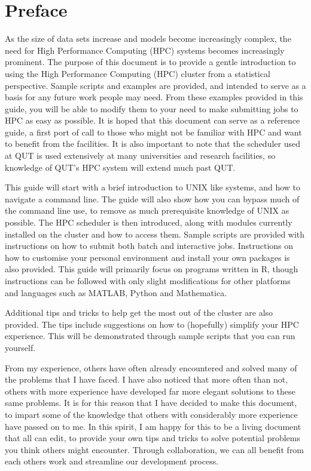 \section*{Preface}
As the size of data sets increase and models become increasingly complex, the need for High Performance Computing (HPC) systems becomes increasingly prominent. The purpose of this document is to provide a gentle introduction to using the High Performance Computing (HPC) cluster from a statistical perspective. Sample scripts and examples are provided, and intended to serve as a basis for any future work people may need. From these examples provided in this guide, you will be able to modify them to your need to make submitting jobs to HPC as easy as possible. It is hoped that this document can serve as a reference guide, a first port of call to those who might not be familiar with HPC and want to benefit from the facilities. It is also important to note that the scheduler used at QUT is used extensively at many universities and research facilities, so knowledge of QUT's HPC system will extend much past QUT.
%
%
\par
%
%
This guide will start with a brief introduction to UNIX like systems, and how to navigate a command line. The guide will also show how you can bypass much of the command line use, to remove as much prerequisite knowledge of UNIX as possible. The HPC scheduler is then introduced, along with modules currently installed on the cluster and how to access them. Sample scripts are provided with instructions on how to submit both batch and interactive jobs. Instructions on how to customise your personal environment and install your own packages is also provided. This guide will primarily focus on programs written in R, though instructions can be followed with only slight modifications for other platforms and languages such as MATLAB, Python and Mathematica.
%
%
\par
%
%
Additional tips and tricks to help get the most out of the cluster are also provided. The tips include suggestions on how to (hopefully) simplify your HPC experience. This will be demonstrated through sample scripts that you can run yourself.
%
%
\par
%
%
From my experience, others have often already encountered and solved many of the problems that I have faced. I have also noticed that more often than not, others with more experience have developed far more elegant solutions to these same problems. It is for this reason that I have decided to make this document, to impart some of the knowledge that others with considerably more experience have passed on to me. In this spirit, I am happy for this to be a living document that all can edit, to provide your own tips and tricks to solve potential problems you think others might encounter. Through collaboration, we can all benefit from each others work and streamline our development process.
%
%
%
%
